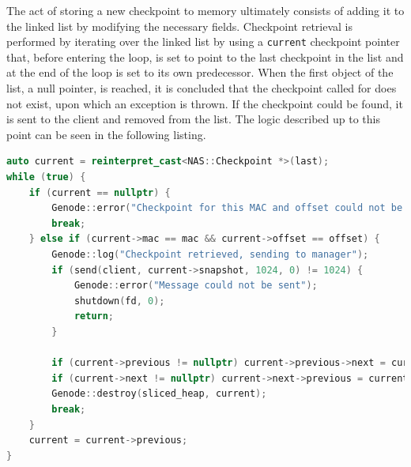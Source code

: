 The act of storing a new checkpoint to memory ultimately consists of adding it to the linked list by modifying the necessary fields.
\newline \newline
Checkpoint retrieval is performed by iterating over the linked list by using a \verb|current| checkpoint pointer that, before entering the loop, is set to point to the last checkpoint in the list and at the end of the loop is set to its own predecessor. When the first object of the list, a null pointer, is reached, it is concluded that the checkpoint called for does not exist, upon which an exception is thrown. If the checkpoint could be found, it is sent to the client and removed from the list. The logic described up to this point can be seen in the following listing.
\newpage
\begin{lstlisting}[language=C++, caption={Checkpoint retrieval logic.}] 
auto current = reinterpret_cast<NAS::Checkpoint *>(last);
while (true) {
    if (current == nullptr) {
        Genode::error("Checkpoint for this MAC and offset could not be found");
        break;
    } else if (current->mac == mac && current->offset == offset) {
        Genode::log("Checkpoint retrieved, sending to manager");
        if (send(client, current->snapshot, 1024, 0) != 1024) {
            Genode::error("Message could not be sent");
            shutdown(fd, 0);
            return;
        }

        if (current->previous != nullptr) current->previous->next = current->next;
        if (current->next != nullptr) current->next->previous = current->previous;
        Genode::destroy(sliced_heap, current);
        break;
    }
    current = current->previous;
}
\end{lstlisting}